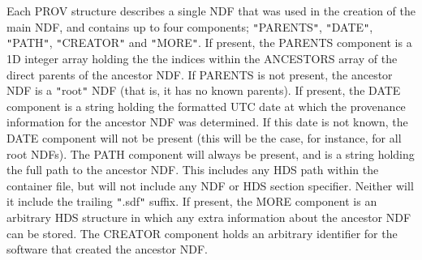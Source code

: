 {{{         \sstitem
         Each PROV structure describes a single NDF that was used in the
         creation of the main NDF, and contains up to four components; {\tt "}PARENTS{\tt "},
         {\tt "}DATE{\tt "}, {\tt "}PATH{\tt "}, {\tt "}CREATOR{\tt "} and {\tt "}MORE{\tt "}. If present, the PARENTS component
         is a 1D integer array holding the the indices within the ANCESTORS array
         of the direct parents of the ancestor NDF. If PARENTS is not present,
         the ancestor NDF is a {\tt "}root{\tt "} NDF (that is, it has no known parents).
         If present, the DATE component is a string holding the formatted UTC
         date at which the provenance information for the ancestor NDF was
         determined. If this date is not known, the DATE component will not
         be present (this will be the case, for instance, for all root NDFs).
         The PATH component will always be present, and is a string holding
         the full path to the ancestor NDF. This includes any HDS path
         within the container file, but will not include any NDF or HDS section
         specifier. Neither will it include the trailing {\tt "}.sdf{\tt "} suffix. If
         present, the MORE component is an arbitrary HDS structure in which
         any extra information about the ancestor NDF can be stored. The
         CREATOR component holds an arbitrary identifier for the software that
         created the ancestor NDF.
      }
   }
}
\newpage
{}
